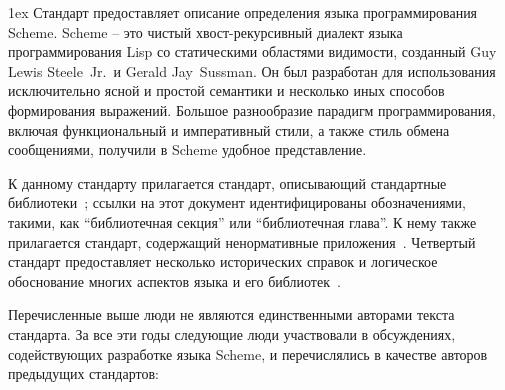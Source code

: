 \documentclass[twoside,twocolumn]{algol60}
\begin{document}
{{\parskip 1ex
Стандарт предоставляет описание определения языка программирования Scheme. Scheme -- это чистый
хвост-рекурсивный диалект языка программирования Lisp со статическими областями видимости,
созданный Guy Lewis Steele~Jr.\ и Gerald Jay~Sussman. Он был разработан для использования
исключительно ясной и простой семантики и несколько иных способов формирования выражений. Большое
разнообразие парадигм программирования, включая функциональный и императивный стили, а также
стиль обмена сообщениями, получили в Scheme удобное представление.

К данному стандарту прилагается стандарт, описывающий стандартные
библиотеки~\cite{R6RS-libraries}; ссылки на этот документ идентифицированы обозначениями,
такими, как ``библиотечная секция'' или ``библиотечная глава''. К нему также прилагается
стандарт, содержащий ненормативные приложения~\cite{R6RS-appendices}. Четвертый стандарт
предоставляет несколько исторических справок и логическое обоснование многих аспектов языка и
его библиотек~\cite{R6RS-rationale}.

\medskip

Перечисленные выше люди не являются единственными авторами текста стандарта. За все эти годы
следующие люди участвовали в обсуждениях, содействующих разработке языка Scheme, и перечислялись
в качестве авторов предыдущих стандартов:

}}
\end{document}

